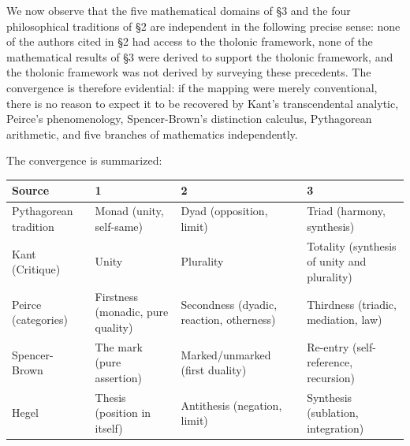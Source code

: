 \documentclass[
  11pt,
  letterpaper,
]{article}
\begin{document}
We now observe that the five mathematical domains of §3 and the four
philosophical traditions of §2 are independent in the following precise
sense: none of the authors cited in §2 had access to the tholonic
framework, none of the mathematical results of §3 were derived to
support the tholonic framework, and the tholonic framework was not
derived by surveying these precedents. The convergence is therefore
evidential: if the mapping were merely conventional, there is no reason
to expect it to be recovered by Kant's transcendental analytic, Peirce's
phenomenology, Spencer-Brown's distinction calculus, Pythagorean
arithmetic, and five branches of mathematics independently.

The convergence is summarized:

\begin{longtable}[]{@{}
  >{\raggedright\arraybackslash}p{}
  >{\raggedright\arraybackslash}p{}
  >{\raggedright\arraybackslash}p{}
  >{\raggedright\arraybackslash}p{}@{}}
\toprule\noalign{}
\begin{minipage}[b]{\linewidth}\raggedright
Source
\end{minipage} & \begin{minipage}[b]{\linewidth}\raggedright
1
\end{minipage} & \begin{minipage}[b]{\linewidth}\raggedright
2
\end{minipage} & \begin{minipage}[b]{\linewidth}\raggedright
3
\end{minipage} \\
\midrule\noalign{}
\endhead
\bottomrule\noalign{}
\endlastfoot
Pythagorean tradition & Monad (unity, self-same) & Dyad (opposition,
limit) & Triad (harmony, synthesis) \\
Kant (Critique) & Unity & Plurality & Totality (synthesis of unity and
plurality) \\
Peirce (categories) & Firstness (monadic, pure quality) & Secondness
(dyadic, reaction, otherness) & Thirdness (triadic, mediation, law) \\
Spencer-Brown & The mark (pure assertion) & Marked/unmarked (first
duality) & Re-entry (self-reference, recursion) \\
Hegel & Thesis (position in itself) & Antithesis (negation, limit) &
Synthesis (sublation, integration) \\

\end{longtable}
\end{document}
